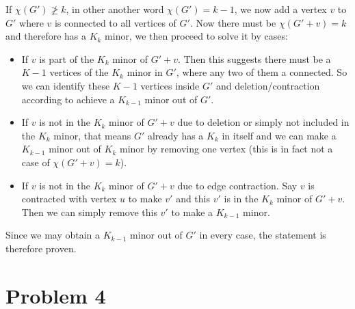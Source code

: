 \documentclass[11pt]{article}
\begin{document}
If $\chi(G') \not \geq k$, in other another word  $\chi(G') = k-1$, we now add a vertex $v$ to $G'$ where $v$ is connected to all vertices of $G'$. Now there must be $\chi(G' + v) = k$ and therefore has a $K_k$ minor, we then proceed to solve it by cases:

\begin{itemize}
    \item If $v$ is part of the $K_k$ minor of $G' + v$. Then this suggests there must be a $K-1$ vertices of the $K_k$ minor in $G'$, where any two of them a connected. So we can identify these $K-1$ vertices inside $G'$ and deletion/contraction according to achieve a $K_{k-1}$ minor out of $G'$.
    \item If $v$ is not in the $K_k$ minor of $G' + v$ due to deletion or simply not included in the $K_k$ minor, that means $G'$ already has a $K_k$ in itself and we can make a $K_{k-1}$ minor out of $K_k$ minor by removing one vertex (this is in fact not a case of $\chi(G' + v) = k$).
    \item If $v$ is not in the $K_k$ minor of $G' + v$ due to edge contraction. Say $v$ is contracted with vertex $u$ to make $v'$ and this $v'$ is in the $K_k$ minor of $G' + v$. Then we can simply remove this $v'$ to make a $K_{k-1}$ minor.
\end{itemize}

Since we may obtain a $K_{k-1}$ minor out of $G'$ in every case, the statement is therefore proven.

\section*{Problem 4}
\end{document}
